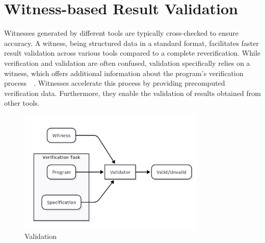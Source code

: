 


  
\section{Witness-based Result Validation}
Witnesses generated by different tools are typically cross-checked to ensure accuracy. 
A witness, being structured data in a standard format, facilitates faster result validation
across various tools compared to a complete reverification. While verification and validation 
are often confused, validation specifically relies on a witness, which offers additional 
information about the program's verification process~\cite{witness2}~\cite{witness1}. 
Witnesses accelerate this process by 
providing precomputed verification data. Furthermore, they enable the validation of results 
obtained from other tools.

\begin{figure}[h]
  \centering
  \includegraphics[width=0.8\textwidth]{figures/validator.png}
  \caption{Validation}
  \label{fig:Validation}
\end{figure}



